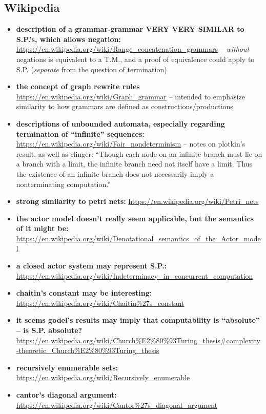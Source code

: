 \documentclass{article}
\begin{document}
\subsection{Wikipedia}
\begin{itemize}
  \item {} \label{rcg} \textbf{description of a grammar-grammar VERY VERY SIMILAR to S.P.'s, which allows negation:} \url{https://en.wikipedia.org/wiki/Range_concatenation_grammars} -- \textit{without} negations is equivalent to a T.M., and a proof of equivalence could apply to S.P. (\textit{separate} from the question of termination)
  \item {} \label{graph-rewriting} \textbf{the concept of graph rewrite rules} \url{https://en.wikipedia.org/wiki/Graph\_grammar} -- intended to emphasize similarity to how grammars are defined as constructions/productions
  \item \textbf{descriptions of unbounded automata, especially regarding termination of ``infinite'' sequences:} \url{https://en.wikipedia.org/wiki/Fair_nondeterminism} -- notes on plotkin's result, as well as clinger: ``Though each node on an infinite branch must lie on a branch with a limit, the infinite branch need not itself have a limit. Thus the existence of an infinite branch does not necessarily imply a nonterminating computation.''
  \item \textbf{strong similarity to petri nets:} \url{https://en.wikipedia.org/wiki/Petri\_nets}
  \item \textbf{the actor model doesn't really seem applicable, but the semantics of it might be:} \url{https://en.wikipedia.org/wiki/Denotational\_semantics\_of\_the\_Actor\_model}
  \item \textbf{a closed actor system may represent S.P.:} \url{https://en.wikipedia.org/wiki/Indeterminacy\_in\_concurrent\_computation}
  \item \textbf{chaitin's constant may be interesting:} \url{https://en.wikipedia.org/wiki/Chaitin\%27s\_constant}
  \item \textbf{it seems godel's results may imply that computability is ``absolute'' -- is S.P. absolute?} \url{https://en.wikipedia.org/wiki/Church\%E2\%80\%93Turing\_thesis\#complexity-theoretic\_Church\%E2\%80\%93Turing\_thesis}
  \item \textbf{recursively enumerable sets:} \url{https://en.wikipedia.org/wiki/Recursively\_enumerable}
  \item \textbf{cantor's diagonal argument:} \url{https://en.wikipedia.org/wiki/Cantor\%27s\_diagonal\_argument}

\end{itemize}
\end{document}
